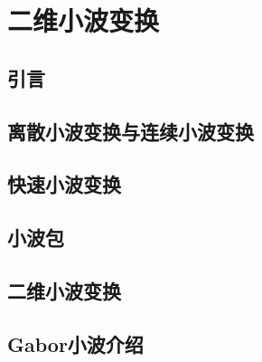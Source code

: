\chapter{二维小波变换}\label{chap:introduction}

\section{引言}

\section{离散小波变换与连续小波变换}

\section{快速小波变换}

\section{小波包}

\section{二维小波变换}

\section{Gabor小波介绍}